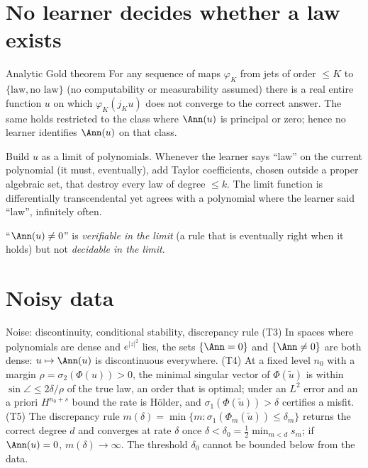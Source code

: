 \section{No learner decides whether a law exists}

\begin{theorem}{Analytic Gold theorem  \proved}\label{thm:convt2}
For any sequence of maps $\varphi_K$ from jets of order $\le K$ to $\{\text{law},\text{no law}\}$ (no computability or measurability assumed) there is a real entire function $u$ on which $\varphi_K(j_Ku)$ does not converge to the correct answer. The same holds restricted to the class where $\Ann(u)$ is principal or zero; hence no learner identifies $\Ann(u)$ on that class.
\end{theorem}

\begin{intuition}
Build $u$ as a limit of polynomials. Whenever the learner says ``law'' on the current polynomial (it must, eventually), add Taylor coefficients, chosen outside a proper algebraic set, that destroy every law of degree $\le k$. The limit function is differentially transcendental yet agrees with a polynomial where the learner said ``law'', infinitely often.
\end{intuition}

\begin{keypoint}
``$\Ann(u)\ne0$'' is \emph{verifiable in the limit} (a rule that is eventually right when it holds) but not \emph{decidable in the limit}.
\end{keypoint}

\section{Noisy data}

\begin{theorem}{Noise: discontinuity, conditional stability, discrepancy rule  \proved}\label{thm:convt45}
(T3) In spaces where polynomials are dense and $e^{|z|^2}$ lies, the sets $\{\Ann=0\}$ and $\{\Ann\ne0\}$ are both dense: $u\mapsto\Ann(u)$ is discontinuous everywhere. (T4) At a fixed level $n_0$ with a margin $\rho=\sigma_2(\Phi(u))>0$, the minimal singular vector of $\Phi(\tilde u)$ is within $\sin\angle\le2\delta/\rho$ of the true law, an order that is optimal; under an $L^2$ error and an a priori $H^{n_0+s}$ bound the rate is H\"older, and $\sigma_1(\Phi(\tilde u))>\delta$ certifies a misfit. (T5) The discrepancy rule $m(\delta)=\min\{m:\sigma_1(\Phi_m(\tilde u))\le\delta_m\}$ returns the correct degree $d$ and converges at rate $\delta$ once $\delta<\delta_0=\tfrac12\min_{m<d}s_m$; if $\Ann(u)=0$, $m(\delta)\to\infty$. The threshold $\delta_0$ cannot be bounded below from the data.
\end{theorem}

